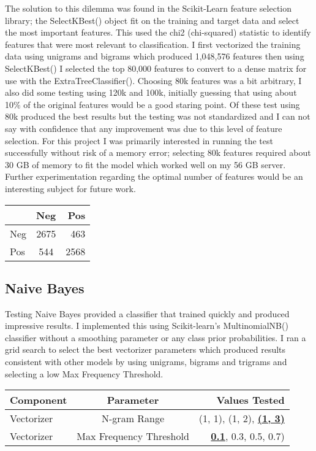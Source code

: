 \documentclass[11pt]{article}
\begin{document}
The solution to this dilemma was found in the Scikit-Learn feature selection library; the SelectKBest()\cite{SelectKBest} object fit on the training and target data and select the most important features. This used the chi2\cite{chi2} (chi-squared) statistic to identify features that were most relevant to classification. I first vectorized the training data using unigrams and bigrams which produced 1,048,576 features then using SelectKBest() I selected the top 80,000 features to convert to a dense matrix for use with the ExtraTreeClassifier(). Choosing 80k features was a bit arbitrary, I also did some testing using 120k and 100k, initially guessing that using about 10\% of the original features would be a good staring point. Of these test using 80k produced the best results but the testing was not standardized and I can not say with confidence that any improvement was due to this level of feature selection. For this project I was primarily interested in running the test successfully without risk of a memory error; selecting 80k features required about 30 GB of memory to fit the model which worked well on my 56 GB server. Further experimentation regarding the optimal number of features would be an interesting subject for future work.
 
\begin{center}
	 \label{cm_rf}
	\begin{tabular}{ l | c | r } \hline
		& 	Neg  	& Pos\\ \hline
	Neg &	2675	& 463 \\
	Pos &	544		& 2568
	\end{tabular}
\end{center}

\subsection{Naive Bayes}

Testing Naive Bayes provided a classifier that trained quickly and produced impressive results. I implemented this using Scikit-learn's MultinomialNB()\cite{MultinomialNB} classifier without a smoothing parameter or any class prior probabilities. I ran a grid search to select the best vectorizer parameters which produced results consistent with other models by using unigrams, bigrams and trigrams and selecting a low Max Frequency Threshold.

\begin{center}
	 \label{params_extree}
	\begin{tabular}{ l | c | r } \hline
	Component & Parameter  & Values Tested\\ \hline
	Vectorizer &	N-gram Range 			& (1, 1), (1, 2), \textbf{\underline{(1, 3)}}\\
	Vectorizer & 	Max Frequency Threshold	& \textbf{\underline{0.1}}, 0.3, 0.5, 0.7)\\
	\end{tabular}
\end{center}
\end{document}
